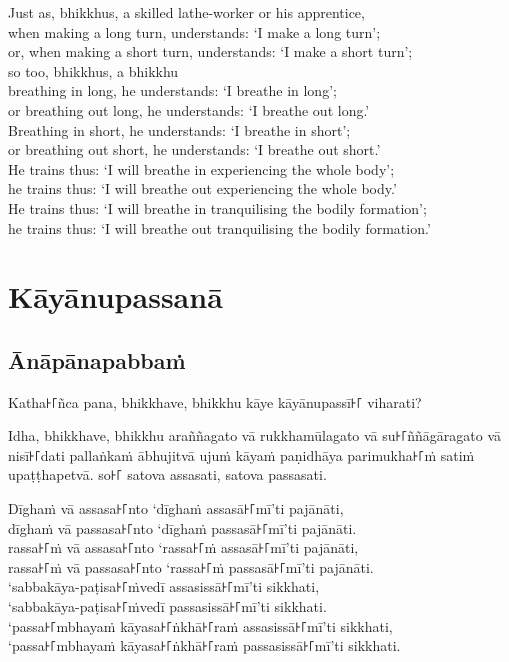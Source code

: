 Just as, bhikkhus, a skilled lathe-worker or his apprentice,\\
when making a long turn, understands: ‘I make a long turn’;\\
or, when making a short turn, understands: ‘I make a short turn’;\\
so too, bhikkhus, a bhikkhu\\
breathing in long, he understands: ‘I breathe in long’;\\
or breathing out long, he understands: ‘I breathe out long.’\\
Breathing in short, he understands: ‘I breathe in short’;\\
or breathing out short, he understands: ‘I breathe out short.’\\
He trains thus: ‘I will breathe in experiencing the whole body’;\\
he trains thus: ‘I will breathe out experiencing the whole body.’\\
He trains thus: ‘I will breathe in tranquilising the bodily formation’;\\
he trains thus: ‘I will breathe out tranquilising the bodily formation.’

\paliPage
\chapter*{Kāyānupassanā}

\section*{Ānāpānapabbaṁ}

Katha꜔꜒ñca pana, bhikkhave, bhikkhu kāye kāyānupassī꜔꜒ viharati?

Idha, bhikkhave, bhikkhu araññagato vā rukkhamūlagato vā su꜔꜒ññāgāragato vā
nisī꜔꜒dati pallaṅkaṁ ābhujitvā ujuṁ kāyaṁ paṇidhāya parimukha꜔꜒ṁ satiṁ upaṭṭhapetvā.
so꜔꜒ satova assasati, satova passasati.

Dīghaṁ vā assasa꜔꜒nto ‘dīghaṁ assasā꜔꜒mī’ti pajānāti,\\
dīghaṁ vā passasa꜔꜒nto ‘dīghaṁ passasā꜔꜒mī’ti pajānāti.\\
rassa꜔꜒ṁ vā assasa꜔꜒nto ‘rassa꜔꜒ṁ assasā꜔꜒mī’ti pajānāti,\\
rassa꜔꜒ṁ vā passasa꜔꜒nto ‘rassa꜔꜒ṁ passasā꜔꜒mī’ti pajānāti.\\
‘sabbakāya-paṭisa꜔꜒ṁvedī assasissā꜔꜒mī’ti sikkhati,\\
‘sabbakāya-paṭisa꜔꜒ṁvedī passasissā꜔꜒mī’ti sikkhati.\\
‘passa꜔꜒mbhayaṁ kāyasa꜔꜒ṅkhā꜔꜒raṁ assasissā꜔꜒mī’ti sikkhati,\\
‘passa꜔꜒mbhayaṁ kāyasa꜔꜒ṅkhā꜔꜒raṁ passasissā꜔꜒mī’ti sikkhati.

